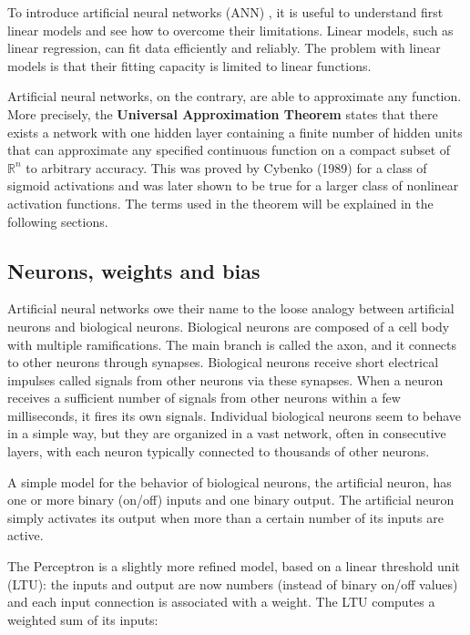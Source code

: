 To introduce artificial neural networks (ANN) \cite{Goodfellow-et-al-2016}, it is useful to understand first linear models and see how to overcome their limitations. Linear models, such as linear regression, can fit data efficiently and reliably. The problem with linear models is that their fitting capacity is limited to linear functions.

Artificial neural networks, on the contrary, are able to approximate any function. More precisely, the \textbf{Universal Approximation Theorem} \cite{prince2023understanding} states that there exists a network with one hidden layer containing a finite number of hidden units that can approximate any specified continuous function on a compact subset of $\mathbb{R}^n$ to arbitrary accuracy. This was proved by Cybenko (1989) for a class of sigmoid activations and was later shown to be true for a larger class of nonlinear activation functions. The terms used in the theorem will be explained in the following sections.


\subsection{Neurons, weights and bias}
\label{subsec:neurons}

Artificial neural networks owe their name to the loose analogy between artificial neurons and biological neurons.
Biological neurons \cite{geron2022hands} are composed of a cell body with multiple ramifications. The main branch is called the axon, and it connects to other neurons through synapses. Biological neurons receive short electrical impulses called signals from other neurons via these synapses. When a neuron receives a sufficient number of signals from other neurons within a few milliseconds, it fires its own signals. Individual biological neurons seem to behave in a simple way, but they are organized in a vast network, often in consecutive layers, with each neuron typically connected to thousands of other neurons.

A simple model for the behavior of biological neurons, the artificial neuron, has one or more binary (on/off) inputs and one binary output. The artificial neuron simply activates its output when more than a certain number of its inputs are active.

The Perceptron is a slightly more refined model, based on a linear threshold unit (LTU): the inputs and output are now numbers (instead of binary on/off values) and each input connection is associated with a weight. The LTU computes a weighted sum of its inputs:

